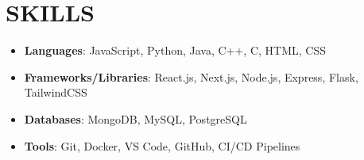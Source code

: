 \documentclass{article}
\begin{document}
\section*{SKILLS}

\begin{itemize}[leftmargin=*]
    \item \textbf{Languages}: JavaScript, Python, Java, C++, C, HTML, CSS
    \item \textbf{Frameworks/Libraries}: React.js, Next.js, Node.js, Express, Flask, TailwindCSS
    \item \textbf{Databases}: MongoDB, MySQL, PostgreSQL
    \item \textbf{Tools}: Git, Docker, VS Code, GitHub, CI/CD Pipelines
\end{itemize}
\end{document}
